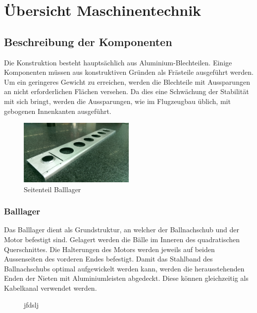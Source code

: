 \section{Übersicht Maschinentechnik}

\subsection{Beschreibung der Komponenten}

Die Konstruktion besteht hauptsächlich aus Aluminium-Blechteilen. Einige 
Komponenten müssen aus konstruktiven Gründen als Frästeile ausgeführt werden. 
Um ein geringeres Gewicht zu erreichen, werden die Blechteile mit Aussparungen 
an nicht erforderlichen Flächen versehen. Da dies eine Schwächung der 
Stabilität mit sich bringt, werden die Aussparungen, wie im Flugzeugbau 
üblich, mit gebogenen Innenkanten ausgeführt.

\begin{figure}[h!]          
    \centering             
    \includegraphics[width=0.5\textwidth]{fig/IMAG0364.jpg}
    \caption{Seitenteil Balllager}
    \label{fig:Seitenteil Balllager}        
\end{figure}

\subsubsection{Balllager}
Das Balllager dient als Grundstruktur, an welcher der Ballnachschub und der 
Motor befestigt sind. Gelagert werden die Bälle im Inneren des quadratischen 
Querschnittes. Die Halterungen des Motors werden jeweils auf beiden 
Aussenseiten des vorderen Endes befestigt. Damit das Stahlband des 
Ballnachschubs optimal aufgewickelt werden kann, werden die herausstehenden 
Enden der Nieten mit Aluminiumleisten abgedeckt. Diese können gleichzeitig als 
Kabelkanal verwendet werden. 

\begin{figure}[h!]          
    \centering             
    \caption{jfdslj}
    \label{fig:hhjfdhfd}        
\end{figure}

